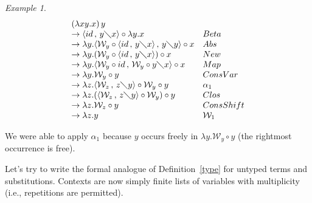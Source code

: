 \documentclass[11pt]{amsart}
\theoremstyle{plain}
\theoremstyle{definition}
\theoremstyle{remark}
\newtheorem{example}[theorem]{Example}
\numberwithin{equation}{section}
\newcommand{\ci}{\circ}
\newcommand{\mi}{\,,\,}
\newcommand{\is}{\diagdown}
\renewcommand{\pi}{\mathcal{W}}
\begin{document}
\begin{example}\label{primer2}
$$\begin{array}{ll}
(\lambda x y.x)\,y & \\
\rightarrow\langle id\mi y\is x\rangle\ci \lambda y.x &
Beta\\
\rightarrow\lambda y.\langle\pi_y\ci \langle id\mi y\is
x\rangle\mi y\is y\rangle\ci x & Abs\\
 \rightarrow\lambda
y.(\pi_y\ci \langle id\mi y\is x\rangle)\ci x &
New\\
\rightarrow\lambda y.\langle\pi_y\ci id\mi \pi_y\ci y\is
x\rangle\ci x & Map\\
 \rightarrow \lambda y.\pi_y\ci
y & ConsVar\\
\rightarrow\lambda z.\langle\pi_z\mi z\is y\rangle\ci \pi_y\ci y &
\alpha_1\\
\rightarrow\lambda z.(\langle\pi_z\mi z\is y\rangle\ci \pi_y)\ci y
& Clos\\
 \rightarrow\lambda z.\pi_z\ci
y & ConsShift\\
\rightarrow\lambda z.y & \pi_1
\end{array}
$$
\end{example}

We were able to apply $\alpha_1$ because $y$ occurs freely in
$\lambda y.\pi_y\circ y$ (the rightmost occurrence is free).

Let's try to write the formal analogue of Definition~\ref{type}
for untyped terms and substitutions. Contexts are now simply
finite lists of variables with multiplicity (i.e., repetitions are
permitted).
\end{document}
